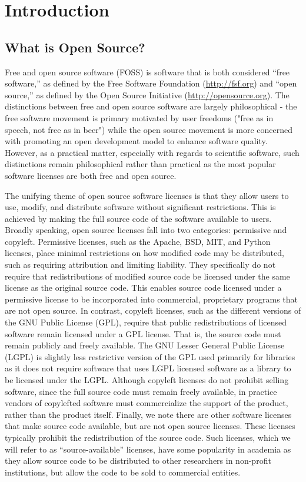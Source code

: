 \section{Introduction}

\subsection*{What is Open Source?}

Free and open source software (FOSS) is software that is both considered ``free software,'' as defined by the Free Software Foundation (\url{http://fsf.org}) and ``open source,'' as defined by the Open Source Initiative (\url{http://opensource.org}).  The distinctions between free and open source software are largely philosophical  - the free software movement is primary motivated by user freedoms ("free as in speech, not free as in beer") while the open source movement is more concerned with promoting an open development model to enhance software quality.  However, as a practical matter, especially with regards to scientific software, such distinctions remain philosophical rather than practical as the most popular software licenses are both free and open source.  

The unifying theme of open source software licenses is that they allow users to use, modify, and distribute software without significant restrictions.  This is achieved by making the full source code of the software available to users.  Broadly speaking, open source licenses fall into two categories: permissive and copyleft. Permissive licenses, such as the Apache, BSD, MIT, and Python licenses, place minimal restrictions on how modified code may be distributed, such as requiring attribution and limiting liability.  They specifically do not require that redistributions of modified source code be licensed under the same license as the original source code.  This enables source code licensed under a permissive license to be incorporated into commercial, proprietary programs that are not open source.  In contrast, copyleft licenses, such as the different versions of the GNU Public License (GPL), require that public redistributions of licensed software remain licensed under a GPL license.  
That is, the source code must remain publicly and freely available. 
 The GNU Lesser General Public License (LGPL) is slightly less restrictive version of the GPL used primarily for libraries as it does not require software that uses LGPL licensed software as a library to be licensed under the LGPL.
Although copyleft licenses do not prohibit selling software, since the full source code must remain freely available, in practice vendors of copylefted software must commercialize the support of the product, rather than the product itself.
Finally, we note there are other software licenses that make source code available, but are not open source licenses.  These licenses typically prohibit the redistribution of the source code.  Such licenses, which we will refer to as ``source-available'' licenses, have some popularity in academia as they allow source code to be distributed to other researchers in non-profit institutions, but allow the code to be sold to commercial entities. 

